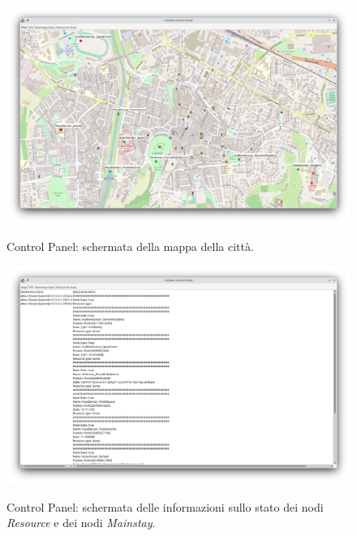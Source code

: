 \documentclass{scrartcl}
\begin{document}
\begin{figure}[H]
    \caption{Control Panel: schermata della mappa della città.}
    \includegraphics[width=\textwidth]{../assets/images/control-panel-map.png}
    \label{fig:control-panel-map}
\end{figure}

\begin{figure}[H]
    \caption{Control Panel: schermata delle informazioni sullo stato dei nodi \textit{Resource} e dei nodi \textit{Mainstay}.}
    \includegraphics[width=\textwidth]{../assets/images/control-panel-info.png}
    \label{fig:control-panel-info}
\end{figure}
\end{document}
